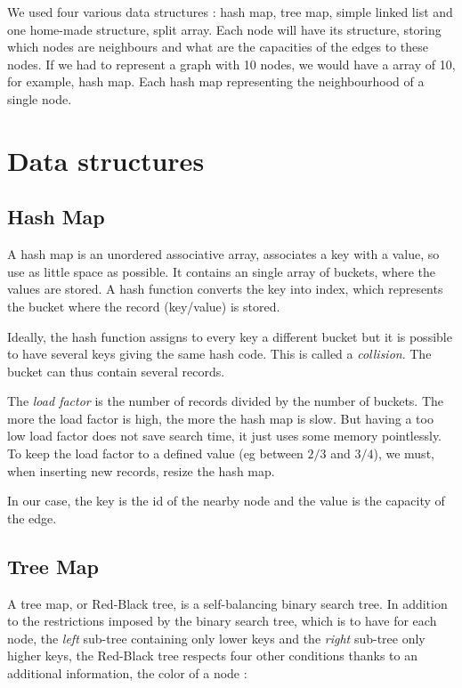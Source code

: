 We used four various data structures : hash map, tree map, simple linked list and one home-made structure, split array. Each node will have its structure, storing which nodes are neighbours and what are the capacities of the edges to these nodes. If we had to represent a graph with 10 nodes, we would have a array of 10, for example, hash map. Each hash map representing the neighbourhood of a single node.

\section{Data structures}
\subsection{Hash Map}
A hash map is an unordered associative array, associates a key with a value, so use as little space as possible. It contains an single array of buckets, where the values are stored. A hash function converts the key into index, which represents the bucket where the record (key/value) is stored. \newline

Ideally, the hash function assigns to every key a different bucket but it is possible to have several keys giving the same hash code. This is called a \textit{collision}. The bucket can thus contain several records. \newline

The \textit{load factor} is the number of records divided by the number of buckets.  The more the load factor is high, the more the hash map is slow. But having a too low load factor does not save search time, it just uses some memory pointlessly. To keep the load factor to a defined value (eg between $2/3$ and $3/4$), we must, when inserting new records, resize the hash map. \newline

In our case, the key is the id of the nearby node and the value is the capacity of the edge.

\subsection{Tree Map}
A tree map, or Red-Black tree, is a self-balancing binary search tree. In addition to the restrictions imposed by the binary search tree, which is to have for each node, the \textit{left} sub-tree containing only lower keys and the \textit{right} sub-tree only higher keys, the Red-Black tree respects four other conditions thanks to an additional information, the color of a node :

